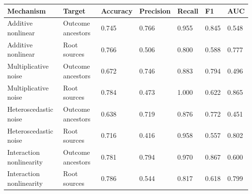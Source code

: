 \begin{tabular}{lllllll}
\toprule
Mechanism & Target & Accuracy & Precision & Recall & F1 & AUC \\
\midrule
Additive nonlinear & Outcome ancestors & 0.745 & 0.766 & 0.955 & 0.845 & 0.548 \\
Additive nonlinear & Root sources & 0.766 & 0.506 & 0.800 & 0.588 & 0.777 \\
Multiplicative noise & Outcome ancestors & 0.672 & 0.746 & 0.883 & 0.794 & 0.496 \\
Multiplicative noise & Root sources & 0.784 & 0.473 & 1.000 & 0.622 & 0.865 \\
Heteroscedastic noise & Outcome ancestors & 0.638 & 0.719 & 0.876 & 0.772 & 0.451 \\
Heteroscedastic noise & Root sources & 0.716 & 0.416 & 0.958 & 0.557 & 0.802 \\
Interaction nonlinearity & Outcome ancestors & 0.781 & 0.794 & 0.970 & 0.867 & 0.600 \\
Interaction nonlinearity & Root sources & 0.786 & 0.544 & 0.817 & 0.618 & 0.799 \\
\bottomrule
\end{tabular}
